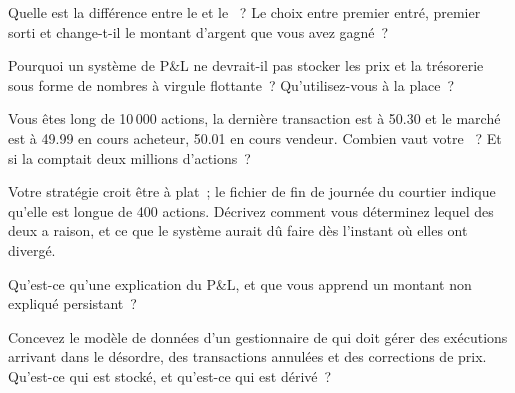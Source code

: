 \begin{interviewq}\label{iq:m1:pnl-and-positions:1}
Quelle est la différence entre le  et le ~? Le choix
entre premier entré, premier sorti et  change-t-il le montant d'argent que vous avez gagné~?
\end{interviewq}

\begin{interviewq}\label{iq:m1:pnl-and-positions:2}
Pourquoi un système de P\&L ne devrait-il pas stocker les prix et la trésorerie sous forme de nombres à virgule flottante~?
Qu'utilisez-vous à la place~?
\end{interviewq}

\begin{interviewq}\label{iq:m1:pnl-and-positions:3}
Vous êtes long de 10\,000 actions, la dernière transaction est à 50.30 et le marché est à 49.99
en cours acheteur, 50.01 en cours vendeur. Combien vaut votre ~? Et si la  comptait deux
millions d'actions~?
\end{interviewq}

\begin{interviewq}\label{iq:m1:pnl-and-positions:4}
Votre stratégie croit être à plat~; le fichier de fin de journée du courtier indique qu'elle est
longue de 400 actions. Décrivez comment vous déterminez lequel des deux a raison, et ce que le
système aurait dû faire dès l'instant où elles ont divergé.
\end{interviewq}

\begin{interviewq}\label{iq:m1:pnl-and-positions:5}
Qu'est-ce qu'une explication du P\&L, et que vous apprend un montant non expliqué
persistant~?
\end{interviewq}

\begin{interviewq}\label{iq:m1:pnl-and-positions:6}
Concevez le modèle de données d'un gestionnaire de  qui doit gérer des exécutions arrivant
dans le désordre, des transactions annulées et des corrections de prix. Qu'est-ce qui est
stocké, et qu'est-ce qui est dérivé~?
\end{interviewq}
